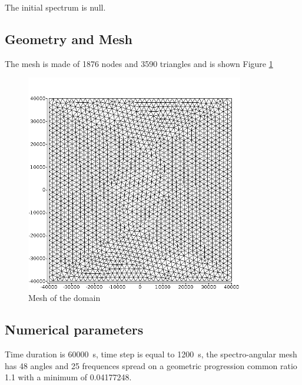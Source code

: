 The initial spectrum is null.
%

%
%
%
%
\subsection{Geometry and Mesh}
%
The mesh is made of 1876 nodes and 3590 triangles and is shown Figure \ref{mail}
\begin{figure} [!h]
\centering
\includegraphics[width=0.85\textwidth]{maill.png}
 \caption{Mesh of the domain}
\label{mail}
\end{figure}

%
%

\subsection{Numerical parameters}
%
Time duration is 60000\ s, time step is equal to 1200\ s, the spectro-angular mesh
has 48 angles and 25 frequences spread on a geometric progression common ratio
1.1 with a minimum of  0.04177248.
%
%
